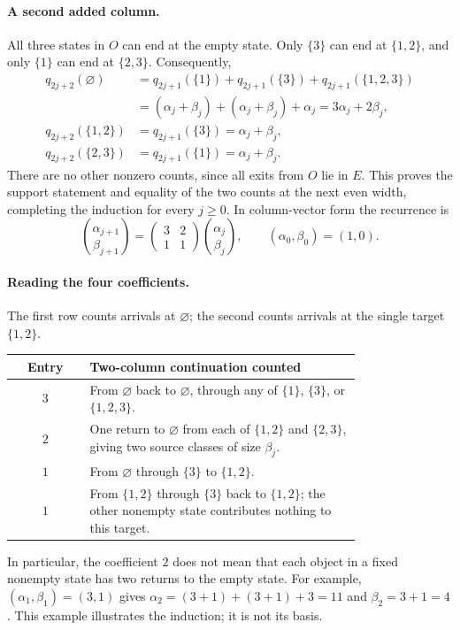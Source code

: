 \paragraph{A second added column.}
All three states in $O$ can end at the empty state. Only $\{3\}$
can end at $\{1,2\}$, and only $\{1\}$ can end at $\{2,3\}$.
Consequently,
\[
\begin{aligned}
q_{2j+2}(\varnothing)
 &=q_{2j+1}(\{1\})+q_{2j+1}(\{3\})+q_{2j+1}(\{1,2,3\})\\
 &=(\alpha_j+\beta_j)+(\alpha_j+\beta_j)+\alpha_j
   =3\alpha_j+2\beta_j,\\
q_{2j+2}(\{1,2\})&=q_{2j+1}(\{3\})=\alpha_j+\beta_j,\\
q_{2j+2}(\{2,3\})&=q_{2j+1}(\{1\})=\alpha_j+\beta_j.
\end{aligned}
\]
There are no other nonzero counts, since all exits from $O$ lie in $E$.
This proves the support statement and equality of the two counts at
the next even width, completing the induction for every $j\ge0$.
In column-vector form the recurrence is
\begin{equation}\label{eq:two-dimensional}
 \binom{\alpha_{j+1}}{\beta_{j+1}}
 =\begin{pmatrix}3&2\\1&1\end{pmatrix}
 \binom{\alpha_j}{\beta_j},\qquad
 (\alpha_0,\beta_0)=(1,0).
\end{equation}

\paragraph{Reading the four coefficients.}
The first row counts arrivals at $\varnothing$; the second counts
arrivals at the single target $\{1,2\}$.
\begin{center}
\small
\begin{tabular}{cp{0.78\linewidth}}
\toprule
Entry & Two-column continuation counted\\
\midrule
$3$ & From $\varnothing$ back to $\varnothing$, through any of
$\{1\}$, $\{3\}$, or $\{1,2,3\}$.\\
$2$ & One return to $\varnothing$ from each of $\{1,2\}$ and
$\{2,3\}$, giving two source classes of size $\beta_j$.\\
$1$ & From $\varnothing$ through $\{3\}$ to $\{1,2\}$.\\
$1$ & From $\{1,2\}$ through $\{3\}$ back to $\{1,2\}$;
the other nonempty state contributes nothing to this target.\\
\bottomrule
\end{tabular}
\end{center}
In particular, the coefficient $2$ does not mean that each object
in a fixed nonempty state has two returns to the empty state.
For example, $(\alpha_1,\beta_1)=(3,1)$ gives
$\alpha_2=(3+1)+(3+1)+3=11$ and $\beta_2=3+1=4$.
This example illustrates the induction; it is not its basis.

